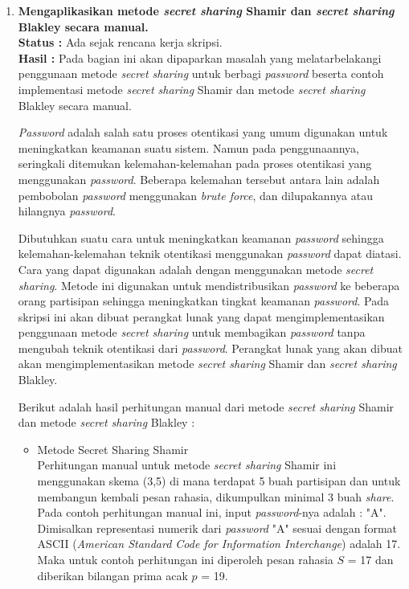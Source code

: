 \documentclass[a4paper,twoside]{article}
\begin{document}
\begin{enumerate}
\vspace{15pt}

		\item \textbf{Mengaplikasikan metode \textit{secret sharing} Shamir dan \textit{secret sharing} Blakley secara manual.}\\
		{\bf Status :} Ada sejak rencana kerja skripsi.\\
		{\bf Hasil :} Pada bagian ini akan dipaparkan masalah yang melatarbelakangi penggunaan metode \textit{secret sharing} untuk berbagi \textit{password} beserta contoh implementasi metode \textit{secret sharing} Shamir dan metode \textit{secret sharing} Blakley secara manual. 
		
\vspace{10pt}

\textit{Password} adalah salah satu proses otentikasi yang umum digunakan untuk meningkatkan keamanan suatu sistem. Namun pada penggunaannya, seringkali ditemukan kelemahan-kelemahan pada proses otentikasi yang menggunakan \textit{password}. Beberapa kelemahan tersebut antara lain adalah pembobolan \textit{password} menggunakan \textit{brute force}, dan dilupakannya atau hilangnya \textit{password}.

\vspace{10pt}
		
Dibutuhkan suatu cara untuk meningkatkan keamanan \textit{password} sehingga kelemahan-kelemahan teknik otentikasi menggunakan \textit{password} dapat diatasi. Cara yang dapat digunakan adalah dengan menggunakan metode \textit{secret sharing}. Metode ini digunakan untuk mendistribusikan \textit{password} ke beberapa orang partisipan sehingga meningkatkan tingkat keamanan \textit{password}. Pada skripsi ini akan dibuat perangkat lunak yang dapat mengimplementasikan penggunaan metode \textit{secret sharing} untuk membagikan \textit{password} tanpa mengubah teknik otentikasi dari \textit{password}. Perangkat lunak yang akan dibuat akan mengimplementasikan metode \textit{secret sharing} Shamir dan \textit{secret sharing} Blakley. 

\vspace{10pt}

Berikut adalah hasil perhitungan manual dari metode \textit{secret sharing} Shamir dan metode \textit{secret sharing} Blakley :
	
\begin{itemize}
\item Metode Secret Sharing Shamir \\
Perhitungan manual untuk metode \textit{secret sharing} Shamir ini menggunakan skema (3,5) di mana terdapat 5 buah partisipan dan untuk membangun kembali pesan rahasia, dikumpulkan minimal 3 buah \textit{share}. Pada contoh perhitungan manual ini, input \textit{password}-nya adalah : "A". Dimisalkan representasi numerik dari \textit{password} "A" sesuai dengan format ASCII (\textit{American Standard Code for Information Interchange}) adalah 17. Maka untuk contoh perhitungan ini diperoleh pesan rahasia $S$ = 17 dan diberikan bilangan prima acak $p$ = 19. \\


\end{itemize}
\end{enumerate}
\end{document}
